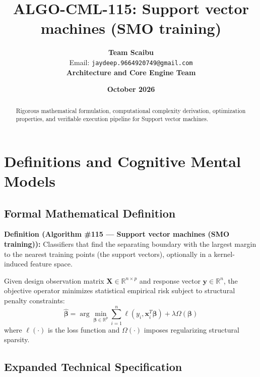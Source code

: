\documentclass[11pt,a4paper]{article}
\title{\textbf{ALGO-CML-115: Support vector machines (SMO training)}}
\author{\textbf{Team Scaibu} \\ \small Email: \texttt{jaydeep.9664920749@gmail.com} \\ \small \textbf{Architecture and Core Engine Team}}
\date{\textbf{October 2026}}
\theoremstyle{definition}
\begin{document}
\maketitle

\begin{abstract}
Rigorous mathematical formulation, computational complexity derivation, optimization properties, and verifiable execution pipeline for Support vector machines.
\end{abstract}

\section{Definitions and Cognitive Mental Models}

\subsection{Formal Mathematical Definition}
\textbf{Definition (Algorithm \#115 --- Support vector machines (SMO training)):}
Classifiers that find the separating boundary with the largest margin to the nearest training points (the support vectors), optionally in a kernel-induced feature space.

Given design observation matrix $\mathbf{X} \in \mathbb{R}^{n \times p}$ and response vector $\mathbf{y} \in \mathbb{R}^n$, the objective operator minimizes statistical empirical risk subject to structural penalty constraints:
\begin{equation}
\hat{\boldsymbol{\beta}} = \arg\min_{\boldsymbol{\beta} \in \mathbb{R}^p} \sum_{i=1}^n \ell(y_i, \mathbf{x}_i^T \boldsymbol{\beta}) + \lambda \Omega(\boldsymbol{\beta})
\end{equation}
where $\ell(\cdot)$ is the loss function and $\Omega(\cdot)$ imposes regularizing structural sparsity.

\subsection{Expanded Technical Specification}
\end{document}
